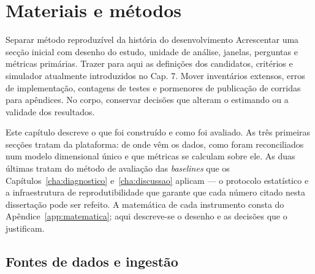 
\chapter{Materiais e métodos}
\label{cha:metodos}
{Separar método reproduzível da história do desenvolvimento}
{Acrescentar uma secção inicial com desenho do estudo, unidade de análise,
janelas, perguntas e métricas primárias. Trazer para aqui as definições
dos candidatos, critérios e simulador atualmente introduzidos no Cap. 7.
Mover inventários extensos, erros de implementação, contagens de testes
e pormenores de publicação de corridas para apêndices. No corpo,
conservar decisões que alteram o estimando ou a validade dos resultados.}%

Este capítulo descreve o que foi construído e como foi avaliado. As três
primeiras secções tratam da plataforma: de onde vêm os dados, como foram
reconciliados num modelo dimensional único e que métricas se calculam sobre
ele. As duas últimas tratam do método de avaliação das \emph{baselines} que
os Capítulos~\ref{cha:diagnostico} e~\ref{cha:discussao} aplicam --- o
protocolo estatístico e a infraestrutura de reprodutibilidade que garante
que cada número citado nesta dissertação pode ser refeito. A matemática de
cada instrumento consta do Apêndice~\ref{app:matematica}; aqui descreve-se o
desenho e as decisões que o justificam.

\section{Fontes de dados e ingestão}
\label{sec:fontes}

